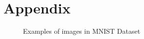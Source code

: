 \chapter{Appendix}

 \begin{figure}[htb]
	\centering
	\epsfxsize=7.5cm
	{}{}\caption{Examples of images in MNIST Dataset \cite{mnistimage}}
	\label{fig:blocks}
\end{figure}